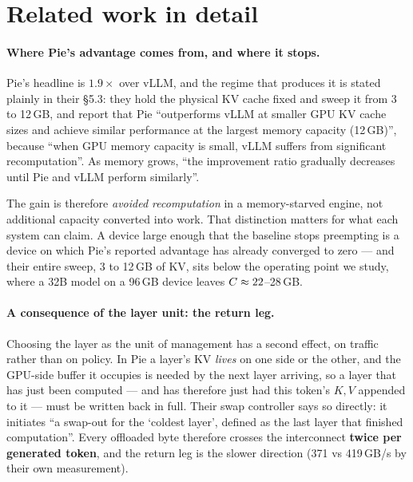 
\section{Related work in detail}
\label{app:related}

\paragraph{Where Pie's advantage comes from, and where it stops.} Pie's
headline is $1.9\times$ over vLLM, and the regime that produces it is stated
plainly in their \S5.3: they hold the physical KV cache fixed and sweep it from
3 to 12\,GB, and report that Pie ``outperforms vLLM at smaller GPU KV cache
sizes and achieve similar performance at the largest memory capacity
(12\,GB)'', because ``when GPU memory capacity is small, vLLM suffers from
significant recomputation''. As memory grows, ``the improvement ratio gradually
decreases until Pie and vLLM perform similarly''.

The gain is therefore \emph{avoided recomputation} in a memory-starved engine,
not additional capacity converted into work. That distinction matters for what
each system can claim. A device large enough that the baseline stops preempting
is a device on which Pie's reported advantage has already converged to zero ---
and their entire sweep, 3 to 12\,GB of KV, sits below the operating point we
study, where a 32B model on a 96\,GB device leaves $C \approx 22$--28\,GB.

\paragraph{A consequence of the layer unit: the return leg.} Choosing the layer
as the unit of management has a second effect, on traffic rather than on
policy. In Pie a layer's KV \emph{lives} on one side or the other, and the
GPU-side buffer it occupies is needed by the next layer arriving, so a layer
that has just been computed --- and has therefore just had this token's $K,V$
appended to it --- must be written back in full. Their swap controller says so
directly: it initiates ``a swap-out for the `coldest layer', defined as the last
layer that finished computation''. Every offloaded byte therefore crosses the
interconnect \textbf{twice per generated token}, and the return leg is the
slower direction (371 vs 419\,GB/s by their own measurement).

